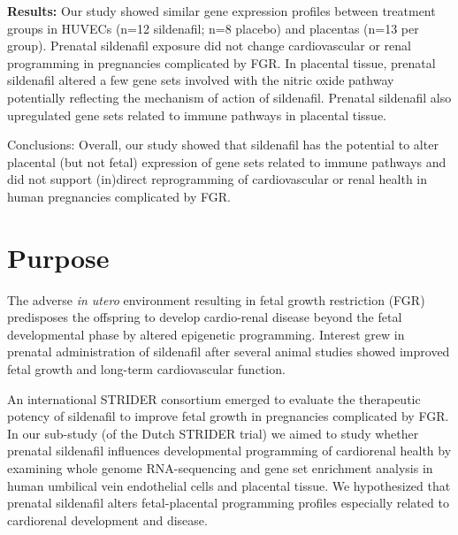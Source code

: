 \documentclass[authordate, empirical]{jote-new-article}
\begin{document}
	\textbf{Results:} Our study showed similar gene expression profiles between treatment groups in HUVECs (n=12 sildenafil; n=8 placebo) and placentas (n=13 per group). Prenatal sildenafil exposure did not change cardiovascular or renal programming in pregnancies complicated by FGR. In placental tissue, prenatal sildenafil altered a few gene sets involved with the nitric oxide pathway potentially reflecting the mechanism of action of sildenafil. Prenatal sildenafil also upregulated gene sets related to immune pathways in placental tissue.



	Conclusions: Overall, our study showed that sildenafil has the potential to alter placental (but not fetal) expression of gene sets related to immune pathways and did not support (in)direct reprogramming of cardiovascular or renal health in human pregnancies complicated by FGR.



	\section{Purpose}







	The adverse \emph{in utero }environment resulting in fetal growth restriction (FGR) predisposes the offspring to develop cardio-renal disease beyond the fetal developmental phase by altered epigenetic programming. Interest grew in prenatal administration of sildenafil after several animal studies showed improved fetal growth and long-term cardiovascular function.







	An international STRIDER consortium emerged to evaluate the therapeutic potency of sildenafil to improve fetal growth in pregnancies complicated by FGR. In our sub-study (of the Dutch STRIDER trial) we aimed to study whether prenatal sildenafil influences developmental programming of cardiorenal health by examining whole genome RNA-sequencing and gene set enrichment analysis in human umbilical vein endothelial cells and placental tissue. We hypothesized that prenatal sildenafil alters fetal-placental programming profiles especially related to cardiorenal development and disease.
\end{document}
